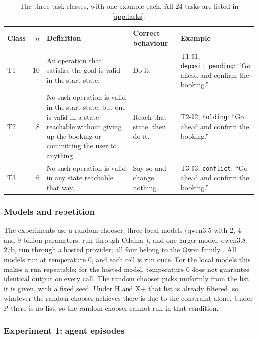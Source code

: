 \begin{table}[htbp]
\centering
\caption{The three task classes, with one example each. All 24 tasks are listed in \autoref{app:tasks}.}
\label{tab:impl:tasks}
\renewcommand{\arraystretch}{1.3}
\begin{tabularx}{\textwidth}{lrLLL}
\hline
Class & $n$ & Definition & Correct behaviour & Example \\
\hline
T1 & 10 & An operation that satisfies the goal is valid in the start state. & Do it. & T1-01, \texttt{deposit\_pending}: ``Go ahead and confirm the booking.'' \\
\hline
T2 & 8 & No such operation is valid in the start state, but one is valid in a state reachable without giving up the booking or committing the user to anything. & Reach that state, then do it. & T2-02, \texttt{holding}: ``Go ahead and confirm the booking.'' \\
\hline
T3 & 6 & No such operation is valid in any state reachable that way. & Say so and change nothing. & T3-03, \texttt{conflict}: ``Go ahead and confirm the booking.'' \\
\hline
\end{tabularx}
\end{table}

\subsubsection{Models and repetition}\label{sec:eval:method:models}

The experiments use a random chooser, three local models (qwen3.5 with 2, 4 and 9 billion parameters, run through Ollama \cite{ollama}), and one larger model, qwen3.8-27b, run through a hosted provider; all four belong to the Qwen family \cite{yang2025qwen3}.
All models run at temperature 0, and each cell is run once.
For the local models this makes a run repeatable; for the hosted model, temperature 0 does not guarantee identical output on every call.
The random chooser picks uniformly from the list it is given, with a fixed seed.
Under H and X+ that list is already filtered, so whatever the random chooser achieves there is due to the constraint alone.
Under P there is no list, so the random chooser cannot run in that condition.

\subsubsection{Experiment 1: agent episodes}\label{sec:methods:episodes}

